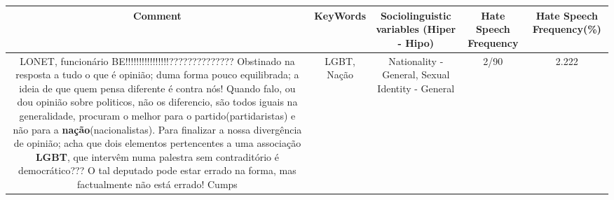 \documentclass[11pt]{article}
\newlength\mylength
\begin{document}
\begin{center}
\setlength\mylength{\dimexpr\textwidth - 1\arrayrulewidth - 50\tabcolsep}
\begin{longtable}{|C{.65\mylength}|C{.30\mylength}|C{.12\mylength}|C{.12\mylength}|C{.12\mylength}|}
\hline
\textbf{Comment} & \textbf{KeyWords} & \textbf{Sociolinguistic variables (Hiper - Hipo)}  & \textbf{Hate Speech Frequency} & \textbf{Hate Speech Frequency(\%)} \\
\hline{}\small LONET, funcionário BE!!!!!!!!!!!!!!!!?????????????? Obstinado na resposta a tudo o que é opinião; duma forma pouco equilibrada; a ideia de que quem pensa diferente é contra nós! Quando falo, ou dou opinião sobre politicos, não os diferencio, são todos iguais na generalidade, procuram o melhor para o partido(partidaristas) e não para a \textbf{nação}(nacionalistas). Para finalizar a nossa divergência de opinião; acha que dois elementos pertencentes a uma associação \textbf{LGBT}, que intervêm numa palestra sem contraditório é democrático??? O tal deputado pode estar errado na forma, mas factualmente não está errado! Cumps\normalsize   & LGBT, Nação & Nationality - General, Sexual Identity - General & 2/90 & 2.222 \\  \hline

\end{longtable}
\end{center}
\end{document}
